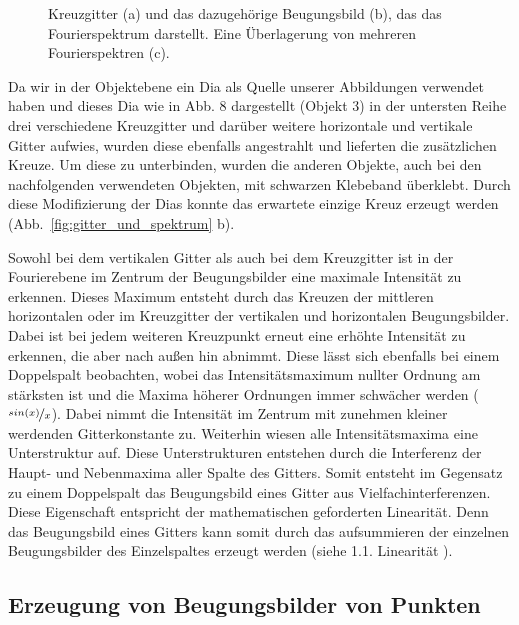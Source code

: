 \begin{figure}[ht]
	\centering
	\caption[Kreuzgitter mit Fourierspektrum]{
		Kreuzgitter (a) und das dazugehörige Beugungsbild (b), das das Fourierspektrum darstellt. Eine Überlagerung von mehreren Fourierspektren (c).
	}
	\label{fig:kreuzgitter_und_spektrum}
\end{figure}

Da wir in der Objektebene ein Dia als Quelle unserer Abbildungen
verwendet haben und dieses Dia wie in Abb. 8 dargestellt (Objekt 3) in der untersten Reihe drei verschiedene Kreuzgitter und darüber weitere horizontale und vertikale Gitter aufwies,
wurden diese ebenfalls angestrahlt und lieferten die zusätzlichen Kreuze. Um diese zu unterbinden, wurden die anderen Objekte, auch bei den nachfolgenden verwendeten Objekten, mit schwarzen Klebeband überklebt. Durch diese Modifizierung der Dias konnte das erwartete einzige Kreuz erzeugt werden (Abb.~\ref{fig:gitter_und_spektrum} b).

Sowohl bei dem vertikalen Gitter als auch bei dem Kreuzgitter ist in der Fourierebene im Zentrum der Beugungsbilder eine maximale Intensität zu erkennen. Dieses Maximum entsteht durch das Kreuzen der mittleren horizontalen oder im Kreuzgitter der vertikalen und
horizontalen Beugungsbilder. Dabei ist bei jedem weiteren Kreuzpunkt erneut eine erhöhte Intensität zu erkennen, die aber nach außen hin abnimmt. Diese lässt sich ebenfalls bei einem
Doppelspalt beobachten, wobei das Intensitätsmaximum nullter Ordnung am stärksten ist und die Maxima höherer Ordnungen immer schwächer werden ($\nicefrac{sin(x)}{x}$). Dabei nimmt die Intensität im Zentrum mit zunehmen kleiner werdenden Gitterkonstante zu.
Weiterhin wiesen alle Intensitätsmaxima eine Unterstruktur auf. Diese Unterstrukturen entstehen durch die Interferenz der Haupt- und Nebenmaxima aller Spalte des Gitters. Somit entsteht im Gegensatz zu einem Doppelspalt das Beugungsbild eines Gitter aus Vielfachinterferenzen. Diese Eigenschaft entspricht der mathematischen geforderten Linearität. Denn das Beugungsbild eines Gitters kann somit durch das aufsummieren der einzelnen Beugungsbilder des Einzelspaltes erzeugt werden (siehe 1.1. Linearität%
).

\subsection{Erzeugung von Beugungsbilder von Punkten}

